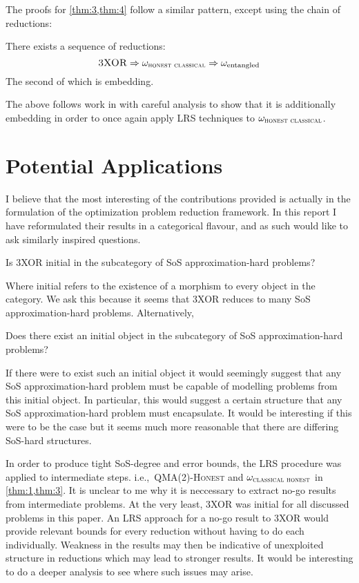\documentclass[runningheads,a4paper,english]{llncs}[2022/01/12]
\newcommand{\ie}{i.e.,\ }
\begin{document}
The proofs for \cref{thm:3,thm:4} follow a similar pattern, except using the chain of reductions:
\begin{lemma}\label{lemma:3}
  There exists a sequence of reductions:
  \[\textsc{3XOR} \Rightarrow \omega_{\textsc{honest classical}} \Rightarrow \omega_{\text{entangled}}\]
  The second of which is embedding.
\end{lemma}
The above follows work in \cite{ito2008oracularizationtwoproveroneroundinteractive} with careful analysis to show that it is additionally embedding in order to once again apply LRS techniques to $\omega_{\textsc{honest classical}}$.

\section{Potential Applications}
\label{sec:applications}
I believe that the most interesting of the contributions provided is actually in the formulation of the optimization problem reduction framework.
In this report I have reformulated their results in a categorical flavour, and as such would like to ask similarly inspired questions.

\begin{conjecture}
Is \textsc{3XOR} initial in the subcategory of SoS approximation-hard problems?
\end{conjecture}
Where initial refers to the existence of a morphism to every object in the category.
We ask this because it seems that \textsc{3XOR} reduces to many SoS approximation-hard problems.
Alternatively,
\begin{conjecture}
Does there exist an initial object in the subcategory of SoS approximation-hard problems?
\end{conjecture}
If there were to exist such an initial object it would seemingly suggest that any SoS approximation-hard problem must be capable of modelling problems from this initial object.
In particular, this would suggest a certain structure that any SoS approximation-hard problem must encapsulate.
It would be interesting if this were to be the case but it seems much more reasonable that there are differing SoS-hard structures.

In order to produce tight SoS-degree and error bounds, the LRS procedure was applied to intermediate steps.
\ie \textsc{QMA(2)-Honest} and $\omega_{\textsc{classical honest}}$ in \cref{thm:1,thm:3}.
It is unclear to me why it is neccessary to extract no-go results from intermediate problems.
At the very least, \textsc{3XOR} was initial for all discussed problems in this paper.
An LRS approach for a no-go result to \textsc{3XOR} would provide relevant bounds for every reduction without having to do each individually.
Weakness in the results may then be indicative of unexploited structure in reductions which may lead to stronger results.
It would be interesting to do a deeper analysis to see where such issues may arise.
\end{document}
